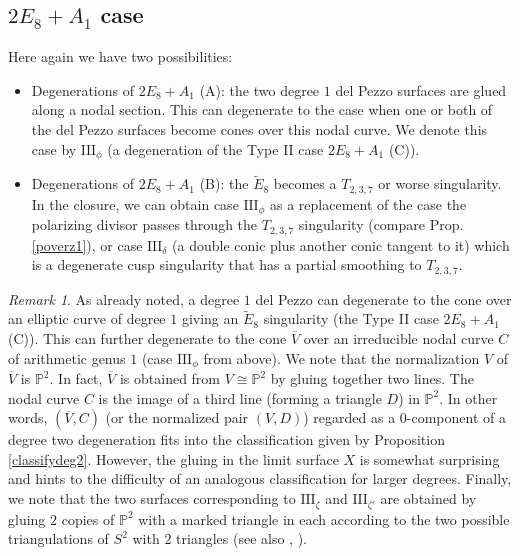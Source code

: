 \documentclass{amsart}
\numberwithin{equation}{section}
\theoremstyle{plain}
\theoremstyle{remark}
\newtheorem{remark}[equation]{Remark}
\theoremstyle{definition}
\newcommand{\bP}{\mathbb{P}}
\newcommand{\Ee}{\widetilde{E}_8}
\newcommand{\III}{\textrm{III}}
\begin{document}
\subsection{$2E_8+A_1$ case} Here again we have two possibilities:
\begin{itemize}
\item[($\textrm{III}_2$)] Degenerations of $2E_8+A_1$ (A): the two degree $1$ del Pezzo surfaces are glued along a nodal section. This can degenerate to the case when one or both of the del Pezzo surfaces become cones over this nodal curve.  We denote this case by $\textrm{III}_\phi$  (a degeneration of the Type II case  $2E_8+A_1$ (C)). 
\item[($\textrm{III}_5$)] Degenerations of $2E_8+A_1$ (B): the $\Ee$ becomes a $T_{2,3,7}$ or  worse singularity.  In the closure,  we can obtain case $\textrm{III}_\phi$ as a replacement of the case the polarizing divisor passes through the $T_{2,3,7}$ singularity (compare Prop. \ref{poverz1}), or case $\textrm{III}_\delta$  (a double conic plus another conic tangent to it) which is a degenerate cusp singularity that has a partial smoothing to $T_{2,3,7}$. 
\end{itemize}

\begin{remark}\label{mostdegdp}
As already noted, a degree $1$ del Pezzo can degenerate to the cone over an elliptic curve of degree $1$ giving an $\Ee$ singularity (the Type II case $2E_8+A_1$ (C)). This can further degenerate to the cone $\overline V$ over an irreducible nodal curve $C$ of arithmetic genus $1$ (case $\textrm{III}_\phi$ from above). We note that the normalization $V$ of $\overline V$  is  $\bP^2$. In fact,  $\overline V$ is obtained from $V\cong \bP^2$ by gluing together two lines. The nodal curve $C$ is the image of a third line (forming a triangle $D$) in $\bP^2$. In other words, $(\overline V,C)$ (or the normalized pair $(V,D)$) regarded as a $0$-component of a degree two degeneration fits into the classification given by Proposition \ref{classifydeg2}. However, the gluing in the limit surface $X$ is somewhat surprising and hints to the difficulty of an analogous classification for larger degrees. Finally, we note that the two surfaces corresponding to $\III_\zeta$ and $\III_{\zeta'}$ are obtained by gluing $2$ copies of $\bP^2$ with a marked triangle in each according to the two possible triangulations of $S^2$ with $2$ triangles (see also \cite{thurston}, \cite{triangulationk3}). 
\end{remark}



\end{document}
